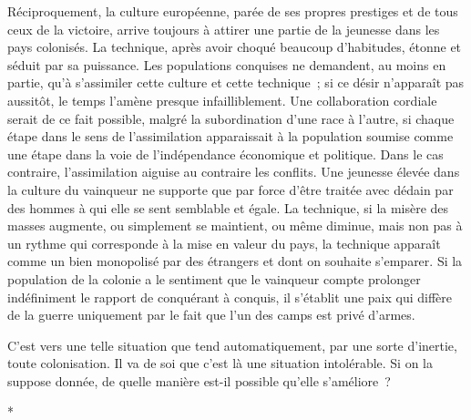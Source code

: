 \documentclass[french,twoside]{book} %
\begin{document}
Réciproquement, la culture européenne, parée de ses propres prestiges et de tous ceux de la victoire, arrive toujours à attirer une partie de la jeunesse dans les pays colonisés. La technique, après avoir choqué beaucoup d'habi­tudes, étonne et séduit par sa puissance. Les populations conquises ne deman­dent, au moins en partie, qu'à s'assimiler cette culture et cette technique ; si ce désir n'apparaît pas aussitôt, le temps l'amène presque infailliblement. Une collaboration cordiale serait de ce fait possible, malgré la subordination d'une race à l'autre, si chaque étape dans le sens de l'assimilation apparaissait à la population soumise comme une étape dans la voie de l'indépendance écono­mique et politique. Dans le cas contraire, l'assimilation aiguise au contraire les conflits. Une jeunesse élevée dans la culture du vainqueur ne supporte que par force d'être traitée avec dédain par des hommes à qui elle se sent semblable et égale. La technique, si la misère des masses augmente, ou simplement se maintient, ou même diminue, mais non pas à un rythme qui corresponde à la mise en valeur du pays, la technique apparaît comme un bien monopolisé par des étrangers et dont on souhaite s'emparer. Si la population de la colonie a le sentiment que le vainqueur compte prolonger indéfiniment le rapport de conquérant à conquis, il s'établit une paix qui diffère de la guerre uniquement par le fait que l'un des camps est privé d'armes.\par
\par
C'est vers une telle situation que tend automatiquement, par une sorte d'inertie, toute colonisation. Il va de soi que c'est là une situation intolérable. Si on la suppose donnée, de quelle manière est-il possible qu'elle s'améliore ?\par

\begin{center}
\noindent \centerline{*}\par
\end{center}
\end{document}
